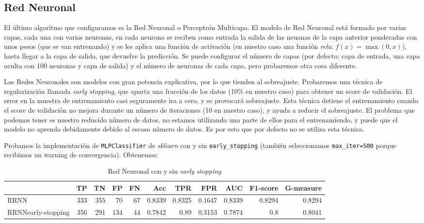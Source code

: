 \documentclass{article}
\begin{document}
\subsection{Red Neuronal}

El último algoritmo que configuramos es la Red Neuronal o Perceptrón
Multicapa. El modelo de Red Neuronal está formado por varias capas,
cada una con varias neuronas, en cada neurona se reciben como entrada
la salida de las neuonas de la capa anterior ponderadas con unos pesos
(que se van entrenando) y se les aplica una función de activación (en
nuestro caso una función \emph{relu}: $f(x)=\max(0,x)$), hasta llegar
a la capa de salida, que devuelve la predicción. Se puede configurar
el número de capas (por defecto: capa de entrada, una capa oculta con
100 neuronas y capa de salida) y el número de neuronas de cada capa,
pero probaremos otra cosa diferente.

Las Redes Neuronales son modelos con gran potencia explicativa, por lo
que tienden al sobreajuste. Probaremos una técnica de regularización
llamada \emph{early stopping}, que aparta una fracción de los datos
(10\% en nuestro caso) para obtener un score de validación. El error
en la muestra de entrenamiento casi seguramente ira a cero, y se
provocará sobreajuste. Esta técnica detiene el entrenamiento cuando el
score de validación no mejora durante un número de iteraciones (10 en
nuestro caso), y ayuda a reducir el sobreajuste. El problema que
podemos tener es nuestro reducido número de datos, no estamos
utilizando una parte de ellos para el entrenamiendo, y puede que el
modelo no aprenda debidamente debido al escaso número de datos. Es por
esto que por defecto no se utiliza esta técnica.

Probamos la implementación de \texttt{MLPClassifier} de
\textit{sklearn} con y sin \texttt{early\_stopping} (también
seleccionamos \texttt{max\_iter=500} porque recibimos un warning de
convergencia). Obtenemos:

\begin{table}[H]
\centering
\caption{Red Neuronal con y sin \emph{early stopping}}
\label{tab:mlp-tuning}
\begin{tabular}{|lrrrrrrrrrr|}
\hline
 & TP & TN & FP & FN & Acc & TPR & FPR & AUC & F1-score & G-measure\\ \hline
RRNN & 333 & 355 & 70 & 67 & 0.8339 & 0.8325 & 0.1647 & 0.8339 & 0.8294 & 0.8294\\
RRNNearly-stopping & 356 & 291 & 134 & 44 & 0.7842 & 0.89 & 0.3153 & 0.7874 & 0.8 & 0.8041\\
\hline
\end{tabular}
\end{table}
\end{document}
